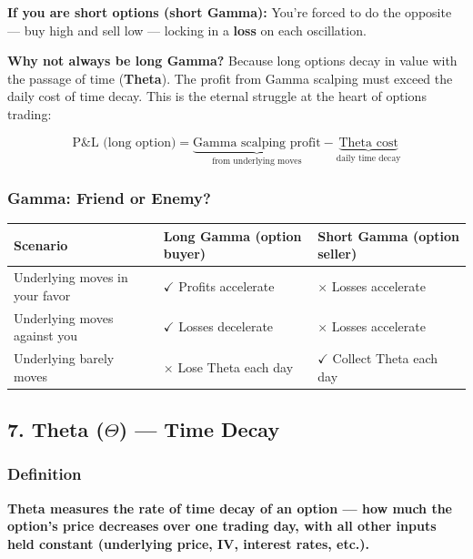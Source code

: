 \documentclass[12pt,openany]{book}
\begin{document}
\textbf{If you are short options (short Gamma):} You're forced to do the opposite — buy high and sell low — locking in a \textbf{loss} on each oscillation.

\textbf{Why not always be long Gamma?}
Because long options decay in value with the passage of time (\textbf{Theta}). The profit from Gamma scalping must exceed the daily cost of time decay. This is the eternal struggle at the heart of options trading:

\[
\boxed{\text{P\&L (long option)} = \underbrace{\text{Gamma scalping profit}}_{\text{from underlying moves}} - \underbrace{\text{Theta cost}}_{\text{daily time decay}}}
\]

\subsubsection{Gamma: Friend or Enemy?}

\begin{center}
\scriptsize
\setlength{\tabcolsep}{3pt}
\begin{tabular}{|L{4.1cm}|L{4.1cm}|L{4.1cm}|}
\hline
\textbf{Scenario} & \textbf{Long Gamma (option buyer)} & \textbf{Short Gamma (option seller)} \\
\hline
Underlying moves in your favor & \(\checkmark\) Profits accelerate & \(\times\) Losses accelerate \\
\hline
Underlying moves against you & \(\checkmark\) Losses decelerate & \(\times\) Losses accelerate \\
\hline
Underlying barely moves & \(\times\) Lose Theta each day & \(\checkmark\) Collect Theta each day \\
\hline
\end{tabular}
\end{center}

\subsection{7. Theta (\texorpdfstring{\(\Theta\)}{Theta}) — Time Decay}

\subsubsection{Definition}

\textbf{Theta measures the rate of time decay of an option — how much the option's price decreases over one trading day, with all other inputs held constant (underlying price, IV, interest rates, etc.).}
\end{document}
